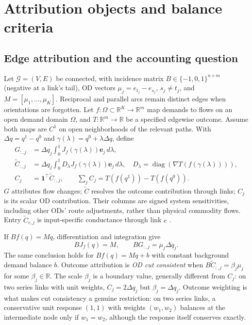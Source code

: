 \documentclass[a4paper,fleqn]{cas-sc}
\newcommand{\R}{\mathbb{R}}
\begin{document}
\section{Attribution objects and balance criteria}\label{sec:objects}
\subsection{Edge attribution and the accounting question}
Let $\mathcal G=(V,E)$ be connected, with incidence matrix
$B\in\{-1,0,1\}^{n\times m}$ (negative at a link's tail), OD vectors
$\mu_j=e_{t_j}-e_{s_j}$, $s_j\ne t_j$, and $M=[\mu_1,\ldots,\mu_K]$.
Reciprocal and parallel arcs remain distinct edges when orientations are
forgotten. Let $f:\Omega\subset\R^K\to\R^m$ map demands to flows on an
open demand domain $\Omega$, and
$T:\R^m\to\R$ be a specified edgewise outcome. Assume both maps are $C^1$
on open neighborhoods of the relevant paths. With $\Delta q=q^1-q^0$ and
$\gamma(\lambda)=q^0+\lambda\Delta q$, define
\begin{align}
G_{:,j}&=\Delta q_j\int_0^1 J_f(\gamma(\lambda))\mathbf e_j\,d\lambda,
\label{eq:Gdef}\\
\widetilde C_{:,j}&=\Delta q_j\int_0^1 D_\lambda J_f(\gamma(\lambda))\mathbf e_j\,d\lambda,
\quad D_\lambda=\operatorname{diag}(\nabla T(f(\gamma(\lambda)))),
\label{eq:Cdef}\\
C_j&=\mathbf1^\top\widetilde C_{:,j},\qquad
\sum_j C_j=T(f(q^1))-T(f(q^0)).\label{eq:Cscalar}
\end{align}
$G$ attributes flow changes; $\widetilde C$ resolves the outcome contribution
through links; $C_j$ is its scalar OD contribution. Their columns are signed
system sensitivities, including other ODs' route adjustments, rather than
physical commodity flows. Entry $\widetilde C_{e,j}$ is input-specific
conductance through link $e$ \citep{dhamdhere2019important}.\label{sec:whyC}

If $Bf(q)=Mq$, differentiation and integration give
\begin{equation}
BJ_f(q)=M,\qquad BG_{:,j}=\mu_j\Delta q_j.\label{eq:anchorchain}
\end{equation}
The same conclusion holds for $Bf(q)=Mq+b$ with constant background demand
balance $b$. Outcome attribution is \emph{OD cut consistent} when
$B\widetilde C_{:,j}=\beta_j\mu_j$ for some $\beta_j\in\R$.
The scale $\beta_j$ is a boundary value, generally different from $C_j$:
on two series links with unit weights, $C_j=2\Delta q_j$ but
$\beta_j=\Delta q_j$. Outcome weighting is what makes cut consistency a
genuine restriction: on two series links, a conservative unit response
$(1,1)$ with weights $(w_1,w_2)$ balances at the intermediate node only
if $w_1=w_2$, although the response itself conserves exactly.
\end{document}
